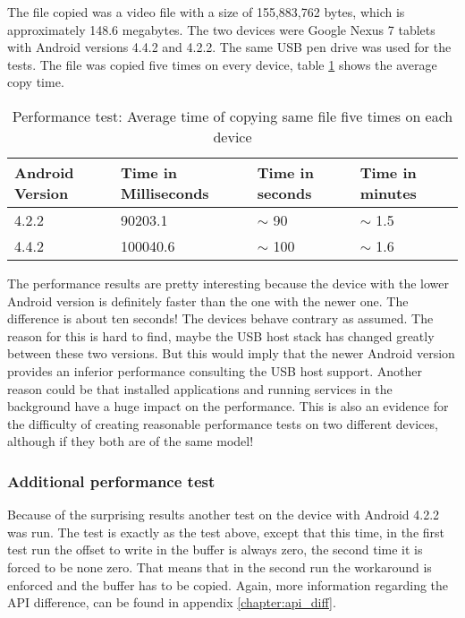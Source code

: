The file copied was a video file with a size of 155,883,762 bytes, which is approximately 148.6 megabytes. The two devices were Google Nexus 7 tablets with Android versions 4.4.2 and 4.2.2. The same USB pen drive was used for the tests. The file was copied five times on every device, table \ref{table:performance_test} shows the average copy time.

\begin{table}[ht]
\caption{Performance test: Average time of copying same file five times on each device}
\centering
\begin{tabular}{|l|l|l|l|}
\hline\hline
\textbf{Android Version} & \textbf{Time in Milliseconds} & \textbf{Time in seconds} & \textbf{Time in minutes} \\ \hline
4.2.2 & 90203.1 & $\sim$ 90 & $\sim$ 1.5 \\ \hline
4.4.2 & 100040.6 & $\sim$ 100 & $\sim$ 1.6 \\ \hline
\end{tabular}
\label{table:performance_test}
\end{table}

The performance results are pretty interesting because the device with the lower Android version is definitely faster than the one with the newer one. The difference is about ten seconds! The devices behave contrary as assumed. The reason for this is hard to find, maybe the USB host stack has changed greatly between these two versions. But this would imply that the newer Android version provides an inferior performance consulting the USB host support. Another reason could be that installed applications and running services in the background have a huge impact on the performance. This is also an evidence for the difficulty of creating reasonable performance tests on two different devices, although if they both are of the same model!

\subsubsection{Additional performance test}

Because of the surprising results another test on the device with Android 4.2.2 was run. The test is exactly as the test above, except that this time, in the first test run the offset to write in the buffer is always zero, the second time it is forced to be none zero. That means that in the second run the workaround is enforced and the buffer has to be copied. Again, more information regarding the API difference, can be found in appendix \ref{chapter:api_diff}.

